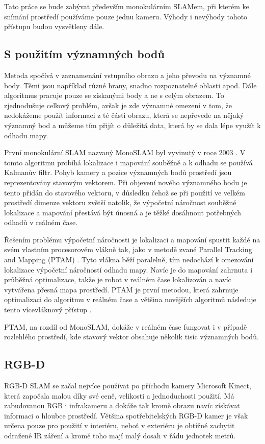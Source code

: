 \documentclass[12pt,a4paper]{report}
\begin{document}
Tato práce se bude zabývat především monokulárním SLAMem, při kterém ke snímání prostředí používáme pouze jednu kameru. Výhody i nevýhody tohoto přístupu budou vysvětleny dále.

\subsection{S použitím významných bodů}
Metoda spočívá v zaznamenání vstupního obrazu a jeho převodu na významné body. Těmi jsou například různé hrany, snadno rozpoznatelné oblasti apod. Dále algoritmus pracuje pouze se získanými body a ne s celým obrazem. To zjednodušuje celkový problém, avšak je zde významné omezení v tom, že nedokážeme použít informaci z té části obrazu, která se nepřevede na nějaký významný bod a můžeme tím přijít o důležitá data, která by se dala lépe využít k odhadu mapy.

První monokulární SLAM nazvaný MonoSLAM byl vyvinutý v roce 2003 \cite{monoslam}. V tomto algoritmu probíhá lokalizace i mapování souběžně a k odhadu se používá Kalmanův filtr. Pohyb kamery a pozice významných bodů prostředí jsou reprezentovány stavovým vektorem. Při objevení nového významného bodu je tento přidán do stavového vektoru, v důsledku čehož se při použití ve velkém prostředí dimenze vektoru zvětší natolik, že výpočetní náročnost souběžné lokalizace a mapování přestává být únosná a je těžké dosáhnout potřebných odhadů v reálném čase. 

Řešením problému výpočetní náročnosti je lokalizaci a mapování spustit každé na svém vlastním procesorovém vlákně tak, jako v metodě zvané Parallel Tracking and Mapping (PTAM) \cite{ptam}. Tyto vlákna běží paralelně, tím nedochází k omezování lokalizace výpočetní náročností odhadu mapy. Navíc je do mapování zahrnuta i průběžná optimalizace, takže je robot v reálném čase lokalizován a navíc vytvářena přesná mapa prostředí. PTAM je první metodou, která zahrnuje optimalizaci do algoritmu v reálném čase a většina novějších algoritmů následuje tento vícevláknový přístup \cite{Taketomi_visual}.

PTAM, na rozdíl od MonoSLAM, dokáže v reálném čase fungovat i v případě rozlehlého prostředí, kde stavový vektor obsahuje několik tisíc významných bodů.

\subsection{RGB-D}
RGB-D SLAM se začal nejvíce používat po příchodu kamery Microsoft Kinect, která započala malou  díky své ceně, velikosti a jednoduchosti použití. Má zabudovanou RGB i infrakameru a dokáže tak kromě obrazu navíc získávat informaci o hloubce prostředí. Většina spotřebitelských RGB-D kamer je však určena pouze pro použití v interiéru, neboť v exteriéru je obtížné zachytit odražené IR záření a kromě toho mají malý dosah v řádu jednotek metrů.
\end{document}
